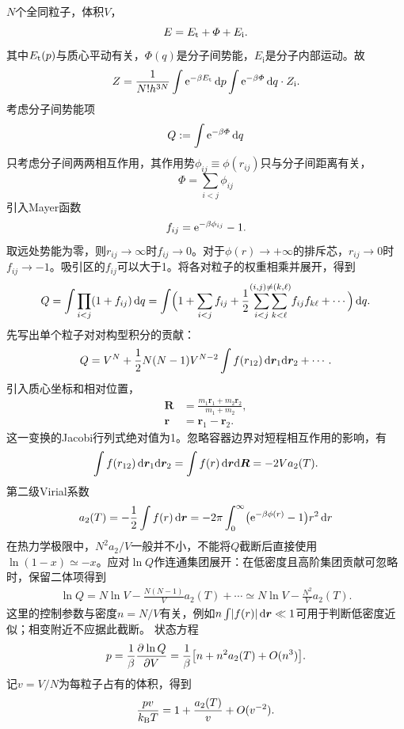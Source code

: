 $N$个全同粒子，体积$V$，
\[
	E = E_\mathrm t + \varPhi + E_{\mathrm i}.
\]
其中$E_\mathrm t(p)$与质心平动有关，$\varPhi(q)$是分子间势能，$E_{\mathrm i}$是分子内部运动。故
\[
	Z = \frac1{N!h^{3N}}\int\mathop{}\!\mathrm{e}^{-\beta E_\mathrm t}\mathop{}\!\mathrm{d} p\int\mathop{}\!\mathrm{e}^{-\beta\varPhi}\mathop{}\!\mathrm{d} q \cdot Z_{\mathrm i}.
\]
考虑分子间势能项
\begin{equation}
	\label{eq:sm-configuration-integral}
	Q := \int\mathop{}\!\mathrm{e}^{-\beta\varPhi}\mathop{}\!\mathrm{d} q
\end{equation}
只考虑分子间两两相互作用，其作用势$\phi_{ij} \equiv \phi(r_{ij})$只与分子间距离有关，
\[
	\varPhi = \sum_{i<j}\phi_{ij}
\]
引入Mayer函数
\begin{equation}
	\label{eq:sm-mayer-function}
	f_{ij} = \mathop{}\!\mathrm{e}^{-\beta\phi_{ij}} - 1.
\end{equation}
取远处势能为零，则$r_{ij} \to \infty$时$f_{ij} \to 0$。对于$\phi(r) \to +\infty$的排斥芯，$r_{ij} \to 0$时$f_{ij} \to -1$。吸引区的$f_{ij}$可以大于1。将各对粒子的权重相乘并展开，得到
\[
	Q = \int\prod_{i<j}(1 + f_{ij})\mathop{}\!\mathrm{d} q = \int\Bigl(1 + \sum_{i<j}f_{ij} + \frac12\overset{(i,j) \neq (k,\ell)}{\sum_{i<j}\sum_{k<\ell}}f_{ij}f_{k\ell} + \cdots\Bigr)\mathop{}\!\mathrm{d} q.
\]
先写出单个粒子对对构型积分的贡献：
\[
	Q = V^N + \frac12N(N - 1)V^{N-2}\int f(r_{12})\mathop{}\!\mathrm{d}\bm r_1\mathrm{d}\bm r_2 + \cdots.
\]
引入质心坐标和相对位置，
\begin{align*}
	\bm R &= \frac{m_1\bm r_1 + m_2\bm r_2}{m_1 + m_2},\\
	\bm r &= \bm r_1 - \bm r_2.
\end{align*}
这一变换的Jacobi行列式绝对值为1。忽略容器边界对短程相互作用的影响，有
\[
	\int f(r_{12})\mathop{}\!\mathrm{d}\bm r_1\mathrm{d}\bm r_2 = \int f(r)\mathop{}\!\mathrm{d}\bm r\mathrm{d}\bm R = -2Va_2(T).
\]
第二级Virial系数
\begin{align}
	a_2(T) = -\frac12\int f(r)\mathop{}\!\mathrm{d}\bm r = -2\pi\int_0^\infty\bigl(\mathop{}\!\mathrm{e}^{-\beta\phi(r)} - 1\bigr)r^2\mathop{}\!\mathrm{d} r
\end{align}
在热力学极限中，$N^2a_2/V$一般并不小，不能将$Q$截断后直接使用$\ln(1 - x) \simeq -x$。应对$\ln Q$作连通集团展开：在低密度且高阶集团贡献可忽略时，保留二体项得到
\begin{align}
	\ln Q = N\ln V - \frac{N(N - 1)}Va_2(T) + \cdots \simeq N\ln V - \frac{N^2}Va_2(T).
\end{align}
这里的控制参数与密度$n = N/V$有关，例如$\textstyle n\int\lvert f(r)\rvert\mathop{}\!\mathrm{d}\bm r \ll 1$可用于判断低密度近似；相变附近不应据此截断。
状态方程
\begin{align*}
	p = \frac1\beta\frac{\partial^{}\ln Q}{\partial{V}^{}} = \frac1\beta\bigl[n + n^2a_2(T) + O(n^3)\bigr].
\end{align*}
记$v = V/N$为每粒子占有的体积，得到
\begin{align}
	\frac{pv}{k_{\mathrm{B}} T} = 1 + \frac{a_2(T)}v + O(v^{-2}).
\end{align}
